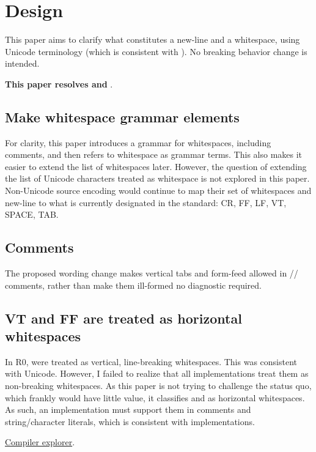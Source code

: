 \documentclass{wg21}
\begin{document}
\section{Design}

This paper aims to clarify what constitutes a new-line and a whitespace, using Unicode terminology (which is consistent with ).
No breaking behavior change is intended.

\textbf{This paper resolves  and  }.

\subsection{Make whitespace grammar elements}

For clarity, this paper introduces a grammar for whitespaces, including comments, and then refers to whitespace as grammar terms.
This also makes it easier to extend the list of whitespaces later.
However, the question of extending the list of Unicode characters
treated as whitespace is not explored in this paper.
Non-Unicode source encoding would continue to map their set of whitespaces and new-line to what is currently designated in the standard: CR, FF, LF, VT, SPACE, TAB.

\subsection{Comments}

The proposed wording change makes vertical tabs and form-feed allowed in // comments, rather than make them ill-formed no diagnostic required.

\subsection{VT and FF are treated as horizontal whitespaces}

In R0,   were treated as vertical, line-breaking whitespaces. This was consistent with Unicode.
However, I failed to realize that all implementations treat them as non-breaking whitespaces.
As this paper is not trying to challenge the status quo, which frankly would have little value, it classifies  and 
as horizontal whitespaces. As such, an implementation must support them in comments and string/character literals, which is consistent with implementations.

\href{https://compiler-explorer.com/z/9ahz7W7xc}{Compiler explorer}.
\end{document}
